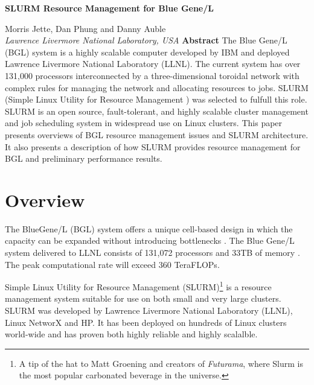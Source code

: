 \documentclass[10pt,onecolumn,times]{../common/llncs}
\def\ctit{SLURM Resource Management for Blue Gene/L}
\def\ucrl{UCRL-JC-TBD}
\def\auth{Morris Jette \\ Danny Auble \\ Dan Phung}
\def\pubdate{October 18, 2004}
\def\journal{Conference TBD}
\begin{document}

\vspace*{35mm}
\noindent\Large
\textbf{\ctit}
\baselineskip
\noindent\large
{Morris Jette, Dan Phung and Danny Auble \\
{\em Lawrence Livermore National Laboratory, USA}
\baselineskip
\noindent\large
\textbf{Abstract}
\baselineskip
\noindent\normalsize
The Blue Gene/L (BGL) system is a highly scalable computer developed 
by IBM and deployed Lawrence Livermore National Laboratory (LLNL). 
The current system has over 131,000 processors interconnected by a 
three-dimensional toroidal network with complex rules for managing 
the network and allocating resources to jobs.
SLURM (Simple Linux Utility for Resource Management ) was selected to 
fulfull this role. 
SLURM is an open source, fault-tolerant, and highly scalable cluster 
management and job scheduling system in widespread use on Linux clusters.
This paper presents overviews of BGL resource management issues and
SLURM architecture.
It also presents a description of how SLURM provides resource 
management for BGL and preliminary performance results.

\newcommand{\munged}{{\tt munged}}
\newcommand{\srun}{{\tt srun}}
\newcommand{\scancel}{{\tt scancel}}
\newcommand{\squeue}{{\tt squeue}}
\newcommand{\scontrol}{{\tt scontrol}}
\newcommand{\sinfo}{{\tt sinfo}}
\newcommand{\slurmctld}{{\tt slurmctld}}
\newcommand{\slurmd}{{\tt slurmd}}
\newcommand{\smap}{{\tt smap}}

\section{Overview}

The BlueGene/L (BGL) system offers a unique cell-based design in which 
the capacity can be expanded without introducing bottlenecks 
\cite{BlueGeneWeb,BlueGeneL2002}.
The Blue Gene/L system delivered to LLNL consists of 
131,072 processors and 33TB of memory \cite{BlueGene2002}.  
The peak computational rate will exceed 360 TeraFLOPs.

Simple Linux Utility for Resource Management (SLURM)\footnote{A tip of 
the hat to Matt Groening and creators of {\em Futurama},
where Slurm is the most popular carbonated beverage in the universe.} 
is a resource management system suitable for use on both small and 
very large clusters. 
SLURM was developed by Lawrence Livermore National Laboratory
(LLNL), Linux NetworX and HP. 
It has been deployed on hundreds of Linux clusters world-wide and has 
proven both highly reliable and highly scalalble.

}
\end{document}
